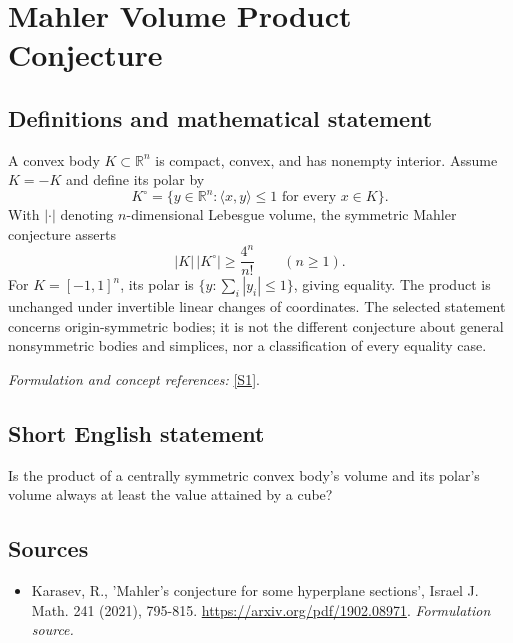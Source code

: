\documentclass[11pt]{article}
\begin{document}
\section*{\texorpdfstring{Mahler Volume Product Conjecture}{Mahler Volume Product Conjecture}}\label{statement}
\subsection{Definitions and mathematical statement}
A convex body $K\subset{\mathbb{R}}^n$ is compact, convex, and has nonempty interior. Assume $K=-K$ and define its polar by
\[
 K^\circ=\{y\in{\mathbb{R}}^n:\langle x,y\rangle\le1\text{ for every }x\in K\}.
\]
With $|\cdot|$ denoting $n$-dimensional Lebesgue volume, the symmetric Mahler conjecture asserts
\[
 |K|\,|K^\circ|\ge\frac{4^n}{n!}\qquad(n\ge1).
\]
For $K=[-1,1]^n$, its polar is $\{y:\sum_i|y_i|\le1\}$, giving equality. The product is unchanged under invertible linear changes of coordinates. The selected statement concerns origin-symmetric bodies; it is not the different conjecture about general nonsymmetric bodies and simplices, nor a classification of every equality case.
\par\smallskip\textit{Formulation and concept references:} \href{https://arxiv.org/pdf/1902.08971}{[S1]}.

\subsection{Short English statement}
Is the product of a centrally symmetric convex body's volume and its polar's volume always at least the value attained by a cube?
\subsection{Sources}
\begin{itemize}
\item[S1]Karasev, R., 'Mahler's conjecture for some hyperplane sections', Israel J. Math. 241 (2021), 795-815.
\url{https://arxiv.org/pdf/1902.08971}.
\textit{Formulation source.}
\end{itemize}
\end{document}
